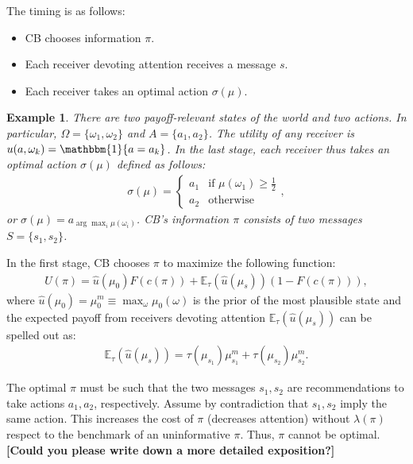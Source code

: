 \documentclass[12pt,a4paper]{article}
\newtheorem{example}{Example}
\begin{document}
The timing is as follows:
\begin{itemize}
    \item CB chooses information $\pi$.
    \item Each receiver devoting attention receives a message $s$. %
    \item Each receiver takes an optimal action $\sigma(\mu)$.
\end{itemize}

\begin{example}
    There are two payoff-relevant states of the world and two actions. In particular, $\Omega=\{\omega_1,\omega_2\}$ and $A=\{a_1,a_2\}$. The utility of any receiver is $u(a,\omega_k)=\mathbbm{1}\{a=a_{k}\}$. In the last stage, each receiver thus takes an optimal action $\sigma(\mu)$ defined as follows: 
    \begin{align}
        \sigma(\mu)=\left\{\begin{array}{ll}
        a_1   &  \mbox{if } \mu(\omega_1)\geq \frac{1}{2}\\
        a_2   &  \mbox{otherwise}
        \end{array}\right.,
    \end{align}
    or $\sigma(\mu) = a_{\arg\max_i\mu(\omega_i)}$. CB's information $\pi$ consists of two messages $S=\{s_1,s_2\}$.
\end{example}


In the first stage, CB chooses $\pi$ to maximize the following function:
\begin{align}
    U(\pi)=\hat{u}(\mu_0)F(c(\pi)) + \mathbb{E}_\tau(\hat{u}(\mu_s))(1-F(c(\pi))),
\end{align}
where $\hat{u}(\mu_0)=\mu_0^m\equiv\max_{\omega}\mu_0(\omega)$ is the prior of the most plausible state and the expected payoff from receivers devoting attention $\mathbb{E}_\tau(\hat{u}(\mu_s))$ can be spelled out as:
\begin{align}
    \mathbb{E}_\tau(\hat{u}(\mu_s)) = \tau(\mu_{s_1})\mu^m_{s_1} + \tau(\mu_{s_2})\mu^m_{s_2}.
\end{align}

The optimal $\pi$ must be such that the two messages $s_1,s_2$ are recommendations to take actions $a_1,a_2$, respectively. Assume by contradiction that $s_1,s_2$ imply the same action. This increases the cost of $\pi$ (decreases attention) without $\lambda(\pi)$ respect to the benchmark of an uninformative $\pi$. Thus, $\pi$ cannot be optimal. \textbf{[Could you please write down a more detailed exposition?]}
\end{document}
